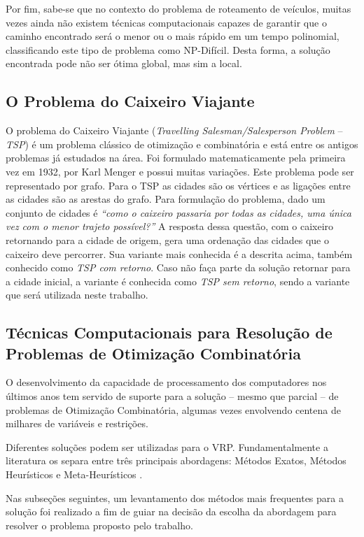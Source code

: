 Por fim, sabe-se que no contexto do problema de roteamento de veículos, muitas vezes ainda não existem técnicas computacionais capazes de garantir que o caminho encontrado será o menor ou o mais rápido em um tempo polinomial, classificando este tipo de problema como NP-Difícil. Desta forma, a solução encontrada pode não ser ótima global, mas sim a local.

\subsection{O Problema do Caixeiro Viajante}

O problema do Caixeiro Viajante (\emph{Travelling Salesman/Salesperson Problem} -- \emph{TSP}) é um problema clássico de otimização e combinatória e está entre os antigos problemas já estudados na área. Foi formulado matematicamente pela primeira vez em 1932, por Karl Menger \cite{oliveira2015extensoes} e possui muitas variações.
Este problema pode ser representado por grafo. Para o TSP as cidades são os vértices e as ligações entre as cidades são as arestas do grafo. Para formulação do problema, dado um conjunto de cidades é \emph{``como o caixeiro passaria por todas as cidades, uma única vez com o menor trajeto possível?''} A resposta dessa questão, com o caixeiro retornando para a cidade de origem, gera uma ordenação das cidades que o caixeiro deve percorrer. Sua variante mais conhecida é a descrita acima, também conhecido como \emph{TSP com retorno}. Caso não faça parte da solução retornar para a cidade inicial, a variante é conhecida como \emph{TSP sem retorno}, sendo a variante que será utilizada neste trabalho. 


\subsection{Técnicas Computacionais para Resolução de Problemas de Otimização Combinatória}
\label{tecnicas-computacionais}
O desenvolvimento da capacidade de processamento dos computadores nos últimos anos tem servido de suporte para a solução -- mesmo que parcial -- de problemas de Otimização Combinatória, algumas vezes envolvendo centena de milhares de variáveis e restrições.

Diferentes soluções podem ser utilizadas para o VRP.  Fundamentalmente a literatura os separa entre três principais abordagens: Métodos Exatos, Métodos Heurísticos e Meta-Heurísticos \cite{maxwell}.  
Nas subseções seguintes, um levantamento dos métodos mais frequentes para a solução foi realizado a fim de guiar na decisão da escolha da abordagem para resolver o problema proposto pelo trabalho.

